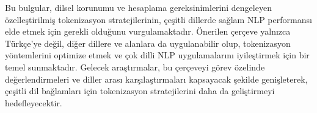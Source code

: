 \documentclass{article}
\begin{document}
Bu bulgular, dilsel korunumu ve hesaplama gereksinimlerini dengeleyen özelleştirilmiş tokenizasyon stratejilerinin, çeşitli dillerde sağlam NLP performansı elde etmek için gerekli olduğunu vurgulamaktadır. Önerilen çerçeve yalnızca Türkçe’ye değil, diğer dillere ve alanlara da uygulanabilir olup, tokenizasyon yöntemlerini optimize etmek ve çok dilli NLP uygulamalarını iyileştirmek için bir temel sunmaktadır. Gelecek araştırmalar, bu çerçeveyi görev özelinde değerlendirmeleri ve diller arası karşılaştırmaları kapsayacak şekilde genişleterek, çeşitli dil bağlamları için tokenizasyon stratejilerini daha da geliştirmeyi hedefleyecektir.


% 

\end{document}
